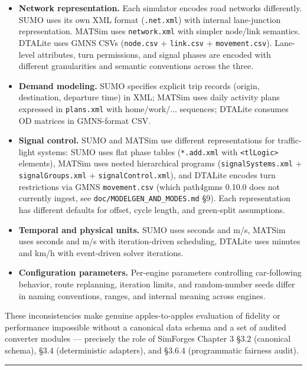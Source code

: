 \begin{itemize}
\item
  \textbf{Network representation.} Each simulator encodes road networks
  differently. SUMO uses its own XML format (\texttt{.net.xml}) with
  internal lane-junction representation. MATSim uses
  \texttt{network.xml} with simpler node/link semantics. DTALite uses
  GMNS CSVs (\texttt{node.csv} + \texttt{link.csv} +
  \texttt{movement.csv}). Lane-level attributes, turn permissions, and
  signal phases are encoded with different granularities and semantic
  conventions across the three.
\item
  \textbf{Demand modeling.} SUMO specifies explicit trip records
  (origin, destination, departure time) in XML; MATSim uses daily
  activity plans expressed in \texttt{plans.xml} with home/work/...
  sequences; DTALite consumes OD matrices in GMNS-format CSV.
\item
  \textbf{Signal control.} SUMO and MATSim use different representations
  for traffic-light systems: SUMO uses flat phase tables
  (\texttt{*.add.xml} with \texttt{\textless{}tlLogic\textgreater{}}
  elements), MATSim uses nested hierarchical programs
  (\texttt{signalSystems.xml} + \texttt{signalGroups.xml} +
  \texttt{signalControl.xml}), and DTALite encodes turn restrictions via
  GMNS \texttt{movement.csv} (which path4gmns 0.10.0 does not currently
  ingest, see \texttt{doc/MODELGEN\_AND\_MODES.md} §9). Each
  representation has different defaults for offset, cycle length, and
  green-split assumptions.
\item
  \textbf{Temporal and physical units.} SUMO uses seconds and m/s,
  MATSim uses seconds and m/s with iteration-driven scheduling, DTALite
  uses minutes and km/h with event-driven solver iterations.
\item
  \textbf{Configuration parameters.} Per-engine parameters controlling
  car-following behavior, route replanning, iteration limits, and
  random-number seeds differ in naming conventions, ranges, and internal
  meaning across engines.
\end{itemize}

These inconsistencies make genuine apples-to-apples evaluation of
fidelity or performance impossible without a canonical data schema and a
set of audited converter modules --- precisely the role of
SimForge\textquotesingle s Chapter 3 §3.2 (canonical schema), §3.4
(deterministic adapters), and §3.6.4 (programmatic fairness audit).

\begin{center}\rule{0.5\linewidth}{0.5pt}\end{center}

